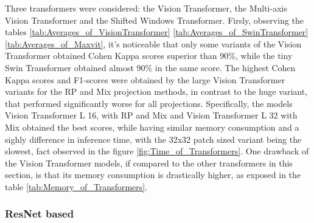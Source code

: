 %





\pagebreak

Three transformers were considered: the Vision Transformer, the Multi-axis Vision Transformer and the Shifted Windows Transformer. Firsly, observing the tables \ref{tab:Averages_of_VisionTransformer} \ref{tab:Averages_of_SwinTransformer} \ref{tab:Averages_of_Maxvit}, it's noticeable that only some variants of the Vision Transformer obtained Cohen Kappa scores superior than 90\%, while the tiny Swin Transformer obtained almost 90\% in the same score. The highest Cohen Kappa scores and F1-scores were obtained by the large Vision Transformer variants for the \acrshort{RP} and \acrshort{Mix} projection methods, in contrast to the huge variant, that performed significantly worse for all projections. Specifically, the models Vision Transformer L 16, with \acrshort{RP} and \acrshort{Mix} and Vision Transformer L 32 with \acrshort{Mix} obtained the best scores, while having similar memory consumption and a sighly difference in inference time, with the 32x32 patch sized variant being the slowest, fact observed in the figure \ref{fig:Time_of_Transformers}. One drawback of the Vision Transformer models, if compared to the other transformers in this section, is that its memory consumption is drastically higher, as exposed in the table \ref{tab:Memory_of_Transformers}. 

\pagebreak

\subsubsection{ResNet based}


%





\pagebreak

